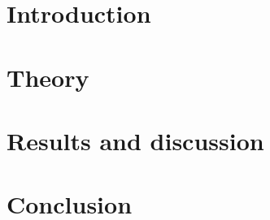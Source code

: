 \documentclass[a4paper]{article}
\begin{document}
\section*{Introduction}


\section*{Theory}


\section*{Results and discussion}


\section*{Conclusion}

\printbibliography[title=References]
\end{document}
